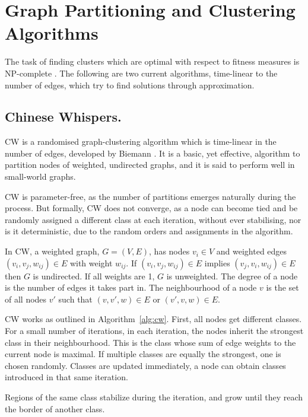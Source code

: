 \section{Graph Partitioning and Clustering Algorithms}
\label{sec:clusteralgorithms}

The task of finding clusters which are optimal with respect to fitness measures
is NP-complete \cite{sima2006np}. The following are two current algorithms,
time-linear to the number of edges, which try to find solutions through
approximation.

\subsection{Chinese Whispers.}
\label{sec:cw}

\ac{CW} is a randomised graph-clustering algorithm which is time-linear in the
number of edges, developed by Biemann \cite{biemann2006chinese}. It is a basic,
yet effective, algorithm to partition nodes of weighted, undirected graphs, and
it is said to perform well in small-world graphs.

\ac{CW} is parameter-free, as the number of partitions emerges naturally during
the process. But formally, \ac{CW} does not converge, as a node can become tied
and be randomly assigned a different class at each iteration, without ever
stabilising, nor is it deterministic, due to the random orders and assignments
in the algorithm.

In \ac{CW}, a weighted graph, $G=(V,E)$, has nodes $v_i \in V$ and weighted
edges $(v_i, v_j, w_{ij}) \in E$ with weight $w_{ij}$. If $(v_i, v_j, w_{ij})
\in E$ implies $(v_j, v_i, w_{ij}) \in E$ then $G$ is undirected. If all weights
are 1, $G$ is unweighted. The degree of a node is the number of edges it takes
part in. The neighbourhood of a node $v$ is the set of all nodes $v'$ such that
$(v,v',w) \in E$ or $(v',v,w) \in E$.

\ac{CW} works as outlined in Algorithm~\ref{alg:cw}. First, all nodes get
different classes. For a small number of iterations, in each iteration, the
nodes inherit the strongest class in their neighbourhood. This is the class
whose sum of edge weights to the current node is maximal. If multiple classes
are equally the strongest, one is chosen randomly. Classes are updated
immediately, a node can obtain classes introduced in that same iteration.

Regions of the same class stabilize during the iteration, and grow until they
reach the border of another class.

